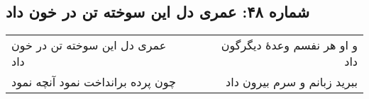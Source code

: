 \begin{center}
\section*{شماره ۴۸: عمری دل این سوخته تن در خون داد}
\label{sec:048}
\begin{longtable}{l p{0.5cm} r}
عمری دل این سوخته تن در خون داد
&&
و او هر نفسم وعدهٔ دیگرگون داد
\\
چون پرده برانداخت نمود آنچه نمود
&&
ببرید زبانم و سرم بیرون داد
\\
\end{longtable}
\end{center}
